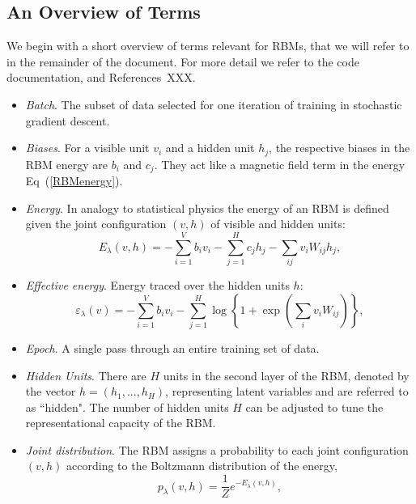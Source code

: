 \documentclass[submission, Phys]{SciPost}
\begin{document}
\subsection{An Overview of Terms}

We begin with a short overview of terms relevant for RBMs, that we will refer to in the remainder of the document.  For more detail we refer to the code documentation, and References~XXX.

\begin{itemize}

\item {\it Batch}.  The subset of data selected for one iteration of training in stochastic gradient descent.

\item {\it Biases}.  For a visible unit $v_i$ and a hidden unit $h_j$, the respective biases in the RBM energy are $b_i$ and $c_j$. They act like a magnetic field term in the energy Eq~(\ref{RBMenergy}).

\item {\it Energy}.  In analogy to statistical physics the energy of an RBM is defined given the joint configuration $(v,h)$ of visible and hidden units:
\begin{equation}
E_{\lambda}(v,h) = - \sum\limits_{i=1}^V b_i v_i - \sum\limits_{j=1}^H c_j h_j - \sum\limits_{ij} v_i W_{ij} h_j, \label{RBMenergy} 
\end{equation}

\item {\it Effective energy}.  Energy traced over the hidden units $h$:
\begin{equation}
\varepsilon_{\lambda}(v) = - \sum\limits_{i=1}^V b_i v_i - \sum\limits_{j=1}^H \log \left\{ 1 + \exp \left( \sum\limits_{i} v_i W_{ij} \right) \right\}, \label{RBMeffectiveenergy} 
\end{equation}

\item {\it Epoch}.  A single pass through an entire training set of data.

\item {\it Hidden Units}.  There are $H$ units in the second layer of the RBM, denoted by the vector $h=(h_1, ..., h_H)$, representing latent variables and are referred to as ``hidden".  The number of hidden units $H$ can be adjusted to tune the representational capacity of the RBM.

\item {\it Joint distribution}.  The RBM assigns a probability to each joint configuration $(v,h)$ according to the Boltzmann distribution of the energy,
\begin{equation}
    p_{\lambda}(v,h) = \frac{1}{Z} e^{-E_{\lambda}(v,h)},
\end{equation}


\end{itemize}
\end{document}
